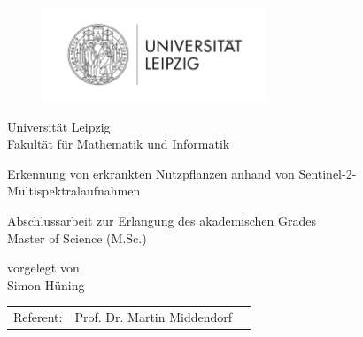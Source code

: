 \pagestyle{empty} %

\begin{figure}[t]
	\centering
	\includegraphics[width=0.6\textwidth]{pics/logo_uni_leipzig}
\end{figure}


\begin{center}
\Large Universität Leipzig \\
\normalsize Fakultät für Mathematik und Informatik\\

\vspace{105 pt}

\Huge Erkennung von erkrankten Nutzpflanzen anhand von Sentinel-2-Multispektralaufnahmen \\ 
\normalsize
\vspace{20 pt}

Abschlussarbeit zur Erlangung des akademischen Grades \\ 
Master of Science (M.Sc.) 

\vspace{60 pt}


vorgelegt von \\
\vspace{5 pt}
Simon Hüning 
\vspace{100 pt}

\begin{tabular}[h]{p{4cm}l l}
	Referent: & Prof. Dr. Martin Middendorf
\end{tabular}


\end{center}